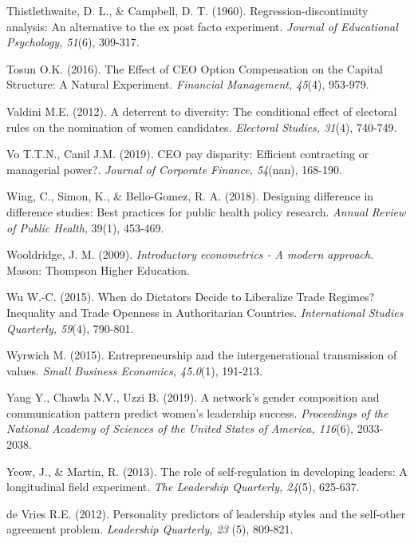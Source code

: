 \documentclass[english]{article}
\begin{document}
\begin{singlespace}
\begin{list}{}{\setlength\itemindent{-\leftmargin}}
\item Thistlethwaite, D. L., \& Campbell, D. T. (1960).  Regression-discontinuity analysis: An alternative to the ex post facto experiment. \emph{Journal of Educational Psychology, 51}(6), 309-317.

\item *Tosun O.K. (2016). The Effect of CEO Option Compensation on the Capital Structure: A Natural Experiment. \emph{Financial Management, 45}(4), 953-979.

\item *Valdini M.E. (2012). A deterrent to diversity: The conditional effect of electoral rules on the nomination of women candidates.  \emph{Electoral Studies, 31}(4), 740-749.

\item *Vo T.T.N., Canil J.M. (2019). CEO pay disparity: Efficient contracting or managerial power?. \emph{Journal of Corporate Finance, 54}(nan), 168-190.

\item Wing, C., Simon, K., \& Bello-Gomez, R. A. (2018). Designing difference in difference studies: Best practices for public health policy research.  \emph{Annual Review of Public Health}, 39(1), 453-469.

\item Wooldridge, J. M. (2009). \emph{Introductory econometrics - A modern approach}. Mason: Thompson Higher Education.

\item *Wu W.-C. (2015). When do Dictators Decide to Liberalize Trade Regimes?  Inequality and Trade Openness in Authoritarian Countries.  \emph{International Studies Quarterly, 59}(4), 790-801.

\item *Wyrwich M. (2015). Entrepreneurship and the intergenerational transmission of values. \emph{Small Business Economics, 45.0}(1), 191-213.

\item *Yang Y., Chawla N.V., Uzzi B. (2019). A network's gender composition and communication pattern predict women's leadership success.  \emph{Proceedings of the National Academy of Sciences of the United States of America, 116}(6), 2033-2038.

\item Yeow, J., \& Martin, R. (2013). The role of self-regulation in developing leaders: A longitudinal field experiment. \emph{The Leadership Quarterly, 24}(5), 625-637.

\item de Vries R.E. (2012). Personality predictors of leadership styles and the self-other agreement problem. \emph{Leadership Quarterly, 23} (5), 809-821.

\end{list}
\end{singlespace}
\end{document}
